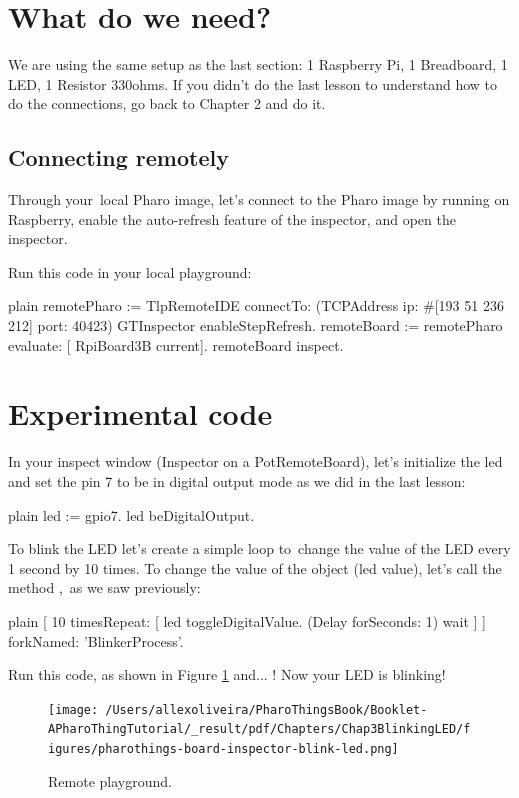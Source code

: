 \documentclass[10pt,twoside,english]{_support/latex/sbabook/sbabook}
\begin{document}
\section{What do we need?}
We are using the same setup as the last section: 1 Raspberry Pi, 1 Breadboard, 1 LED, 1 Resistor 330ohms. If you didn't do the last lesson to understand how to do the connections, go back to Chapter 2 and do it.
\subsection{Connecting remotely}
Through your local Pharo image, let's connect to the Pharo image by running on Raspberry, enable the auto-refresh feature of the inspector, and open the inspector.

Run this code in your local playground:

\begin{displaycode}{plain}
remotePharo := TlpRemoteIDE connectTo: (TCPAddress ip: #[193 51 236 212] port: 40423)
GTInspector enableStepRefresh.
remoteBoard := remotePharo evaluate: [ RpiBoard3B current].
remoteBoard inspect.
\end{displaycode}
\section{Experimental code}
In your inspect window (Inspector on a PotRemoteBoard), let's initialize the led and set the pin 7 to be in digital output mode as we did in the last lesson:

\begin{displaycode}{plain}
led := gpio7.
led beDigitalOutput.
\end{displaycode}

To blink the LED let's create a simple loop to change the value of the LED every 1 second by 10 times. To change the value of the object (led value), let's call the method , as we saw previously:

\begin{displaycode}{plain}
[ 10 timesRepeat: [
	led toggleDigitalValue.
 	(Delay forSeconds: 1) wait
] ] forkNamed: 'BlinkerProcess'.
\end{displaycode}

Run this code, as shown in Figure \ref{RemoteInspector} and... ! Now your LED is blinking!


\begin{figure}

\begin{center}
\texttt{[image: /Users/allexoliveira/PharoThingsBook/Booklet-APharoThingTutorial/\_result/pdf/Chapters/Chap3BlinkingLED/figures/pharothings-board-inspector-blink-led.png]}\caption{Remote playground.\label{RemoteInspector}}\end{center}
\end{figure}
\end{document}
